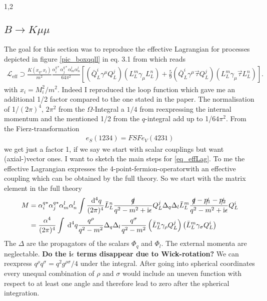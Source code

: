 \documentclass[11pt,a4paper,twoside]{article}
\begin{document}
\begin{spacing}{1,2}
\subsection{$B \rightarrow K\mu\mu$}
The goal for this section was to reproduce the effective Lagrangian for processes depicted in figure \ref{pic_boxqqll} in eq. 3.1 from \cite{Grip} which reads
\begin{align}
 \mathcal{L}_\text{eff} \supset \frac{K(x_q,x_l)}{m^2}\frac{\alpha_i^{q*} \alpha_j^{q*} \alpha_m^l \alpha_n^l}{64\pi^2}\left[\left(\bar Q^i_L\gamma^\mu Q^j_L\right)\left(L^m_L\gamma_\mu L^n_L\right)+\frac59\left(\bar Q^i_L\gamma^\mu \vec \tau Q^j_L\right)\left(L^m_L\gamma_\mu \vec \tau L^n_L\right)\right].
 \label{eq_effLag}
\end{align}
with $x_i = M_i^2/m^2$. Indeed I reproduced the loop function which gave me an additional 1/2 factor compared to the one stated in the paper. The normalisation of 1/$(2\pi)^4$, $2\pi^2$
from the $\Omega$-Integral a $1/4$ from reexpressing the internal momentum and the mentioned 1/2 from the $q$-integral add up to 1/$64\pi^2$. From the 
Fierz-transformation \cite{Fierz}
\begin{align}
 e_S(1234) = FSF e_V(4231)
\end{align}
we get just a factor 1, if we say we start with scalar couplings but want (axial-)vector ones. I want to sketch the main steps for \eqref{eq_effLag}. 
To me the effective Lagrangian expresses the 4-point-fermion-operatorwith an effective coupling which can be obtained by the full theory. 
So we start with the matrix element in the full theory
\begin{align}
 M &= \alpha_i^{q*} \alpha_j^{q*} \alpha_m^l \alpha_n^l \int \frac{\; \mathrm{d}^4 q}{(2\pi)^4} \bar L_L^n \frac{\slashed{q}}{q^2-m^2+\text{i}\epsilon}Q_L^j \Delta_q \Delta_l \bar L_L^m \frac{\slashed{q}-\slashed{p_1}-\slashed{p_2}}{q^2-m^2+\text{i}\epsilon}Q_L^i\\
 &=\frac{\alpha^4}{(2\pi)^4} \int \; \mathrm{d}^4 q \frac{q^\rho}{q^2-m^2}\Delta_q \Delta_l \frac{q^\sigma}{q^2-m^2} \left(\bar L_L^n \gamma_\rho Q_L^j\right)\left(\bar L_L^m \gamma_\sigma Q_L^i\right)
\end{align}
The $\Delta$ are the propagators of the scalars $\Phi_q$ and $\Phi_l$. The external momenta are neglectable. \textbf{Do the i$\epsilon$ terms disappear due to
Wick-rotation?} We can reexpress $q^\rho q^\sigma = q^2 g^{\rho\sigma}/4$ under the integral. After going into spherical coordinates every unequal combination
of $\rho$ and $\sigma$ would include an uneven function with respect to at least one angle and therefore lead to zero after the spherical integration. 

\end{spacing}
\end{document}
